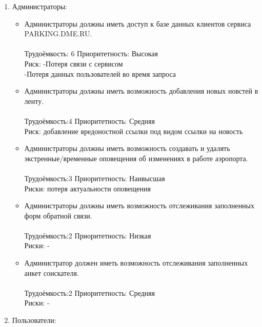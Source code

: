 \begin{enumerate}
      \item Администраторы:
      \begin{itemize}
            \item Администраторы должны иметь доступ к базе
                  данных клиентов сервиса PARKING.DME.RU.
                  \\\\
                  Трудоёмкость: 6   Приоритетность: Высокая \\Риск: -Потеря связи с сервисом\\ -Потеря данных пользователей во время запроса
                  \\
            \item Администраторы должны иметь возможность
                  добавления новых новстей в ленту.
                  \\\\
                  Трудоёмкость:4    Приоритетность: Средняя \\Риск: добавление вредоностной ссылки под видом ссылки на новость
                  \\
            \item Администраторы должны иметь возможность
                  создавать и удалять экстренные/временные
                  оповещения об изменениях в работе аэропорта.
                  \\\\
                  Трудоёмкость:3    Приоритетность: Наивысшая \\Риски: потеря актуальности оповещения
                  \\
            \item Администраторы должны иметь возможность
                  отслеживания заполненных форм обратной связи.
                  \\\\
                  Трудоёмкость:2    Приоритетность: Низкая \\Риски: -
                  \\
            \item Администратор должен иметь возможность
                  отслеживания заполненных анкет соискателя.
                  \\\\
                  Трудоёмкость:2    Приоритетность: Средняя \\Риски: -
      \end{itemize}
      \item Пользователи:

\end{enumerate}
